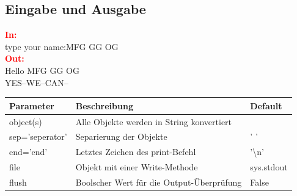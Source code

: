 	\subsection*{Eingabe und Ausgabe}
		\begin{minipage}[h]{7cm}
			
			\textcolor{red}{\textbf{In:}}
			\\type your name:MFG GG OG
			\\\textcolor{red}{\textbf{Out:}}
			\\Hello MFG GG OG
			\\YES--WE--CAN--
		\end{minipage}
		\begin{minipage}[t]{8cm}
			\begin{tabular}{|l l l|}
				\hline \bfseries{Parameter} & \bfseries{Beschreibung} & \bfseries{Default}
				\\\hline object(s) & Alle Objekte werden in String konvertiert & 
				\\ sep='seperator' & Separierung der Objekte & ' '
				\\ end='end' & Letztes Zeichen des print-Befehl & '\textbackslash n'
				\\ file & Objekt mit einer Write-Methode & sys.stdout
				\\ flush & Boolscher Wert für die Output-Überprüfung & False
				\\\hline
			\end{tabular}
		\end{minipage}